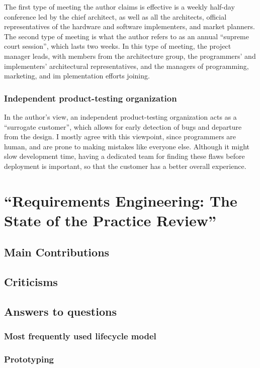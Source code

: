 \documentclass[letterpaper,12pt]{article}
\begin{document}
The first type of meeting the author claims is effective is a weekly half-day
conference led by the chief architect, as well as all the architects, official
representatives of the hardware and software implementers, and market planners.
The second type of meeting is what the author refers to as an annual ``supreme
court session'', which lasts two weeks. In this type of meeting, the project
manager leads, with members from the architecture group,  the programmers' and
implementers' architectural representatives, and the managers of programming,
marketing, and im plementation efforts joining.

\subsubsection{Independent product-testing organization}

In the author's view, an independent product-testing organization acts  as a
``surrogate customer'', which allows for early detection of bugs and departure
from the design. I mostly agree with this viewpoint, since programmers are
human, and are prone to making mistakes like everyone else. Although it might
slow development time, having a dedicated team for finding these flaws before
deployment is important, so that the customer has a better overall experience.

\section{``Requirements Engineering: The State of the Practice Review''}

\subsection{Main Contributions}
\lipsum[3]

\subsection{Criticisms}
\lipsum[4]

\subsection{Answers to questions}
\subsubsection{Most frequently used lifecycle model}
\lipsum[66]
\subsubsection{Prototyping}
\lipsum[66]
\end{document}
